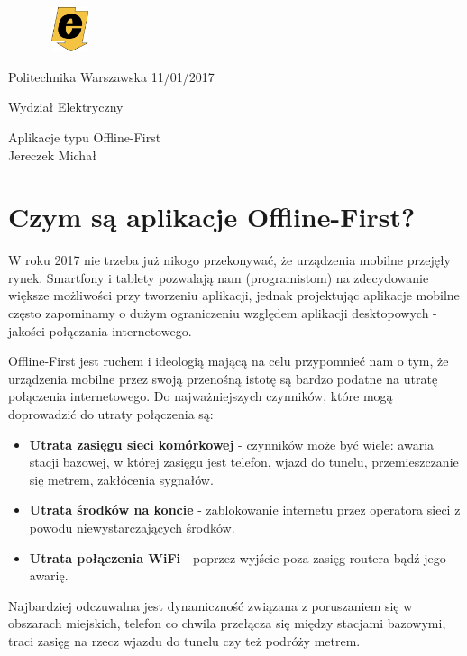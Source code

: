 \documentclass[a4paper, 12pt]{article}
\begin{document}
\begin{figure}
\includegraphics[width=1.5cm,height=1.3cm,keepaspectratio]{ee.png}
\end{figure}

Politechnika Warszawska 
\hfill 11/01/2017

Wydział Elektryczny


\quad
\begin{center}
\center \Huge Aplikacje typu Offline-First
\vspace{0.5cm}\\
\small Jereczek Michał
\end{center}

\tableofcontents
\pagebreak

\section{Czym są aplikacje Offline-First?}
W roku 2017 nie trzeba już nikogo przekonywać, że urządzenia mobilne przejęły rynek. Smartfony i tablety pozwalają nam (programistom) na zdecydowanie większe możliwości przy tworzeniu aplikacji, jednak projektując aplikacje mobilne często zapominamy o dużym ograniczeniu względem aplikacji desktopowych - jakości połączania internetowego.

Offline-First jest ruchem i ideologią mającą na celu przypomnieć nam o tym, że urządzenia mobilne przez swoją przenośną istotę są bardzo podatne na utratę połączenia internetowego. Do najważniejszych czynników, które mogą doprowadzić do utraty połączenia są:
\begin{itemize}
\item \textbf{Utrata zasięgu sieci komórkowej} - czynników może być wiele: awaria stacji bazowej, w której zasięgu jest telefon, wjazd do tunelu, przemieszczanie się metrem, zakłócenia sygnałów.
\item \textbf{Utrata środków na koncie} - zablokowanie internetu przez operatora sieci z powodu niewystarczających środków.
\item \textbf{Utrata połączenia WiFi} - poprzez wyjście poza zasięg routera bądź jego awarię.
\end{itemize}
Najbardziej odczuwalna jest dynamiczność związana z poruszaniem się w obszarach miejskich, telefon co chwila przełącza się między stacjami bazowymi, traci zasięg na rzecz wjazdu do tunelu czy też podróży metrem. 
\end{document}

